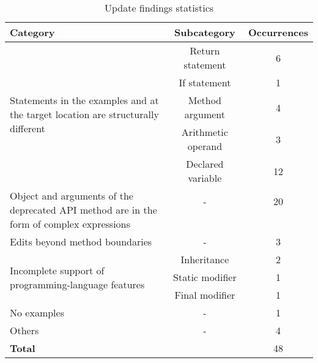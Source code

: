 \begin{table}
\caption{Update findings statistics}
\begin{center}
\begin{tabular}{ | p{12em} |c|c| }
 \hline
 \textbf{Category} & \textbf{Subcategory} & \textbf{Occurrences} \\
 \hline
 \multirow{5}{12em}{Statements in the examples and at the target location are structurally different} & Return statement & 6 \\\cline{2-3} & If statement & 1 \\\cline{2-3} & Method argument & 4 \\\cline{2-3} & Arithmetic operand & 3 \\\cline{2-3}  & Declared variable & 12 \\\cline{2-3}
 \hline
  \multirow{4}{12em}{Object and arguments of the deprecated API method are in the form of complex expressions} & - & 20\\&&\\&&\\&&\\
 \hline
 Edits beyond method boundaries & - & 3\\
\hline
 \multirow{3}{12em}{Incomplete support of programming-language features} & Inheritance & 2\\\cline{2-3} & Static modifier & 1 \\\cline{2-3} & Final modifier & 1\\\cline{2-3}
 \hline
 No examples & - & 1\\
 \hline
 Others & - & 4\\
 \hline
 \multicolumn{2}{|l|}{\bf Total} & 48\\
 \hline
\end{tabular}
\end{center}
\label{table:data_statistic}
\end{table}

